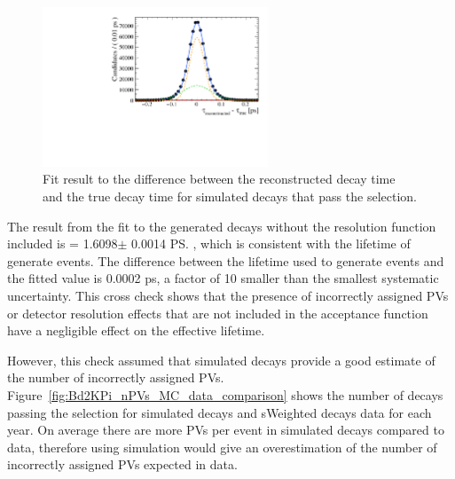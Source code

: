 \begin{figure}[htbp]
  \centering
    \includegraphics[width=0.6\textwidth]{./Figs/LifetimeSystematics/PV_decaytime_diff_fit.pdf}
  \caption{Fit result to the difference between the reconstructed decay time and the true decay time for simulated decays that pass the \bsmumu \el selection.}
  \label{fig:PVfit}
\end{figure}


The result from the fit to the generated decays without the resolution function included is \tmumu = 1.6098$\pm$ 0.0014 \ps, which is consistent with the lifetime of generate events. The difference between the lifetime used to generate events and the fitted value is 0.0002 ps, a factor of 10 smaller than the smallest systematic uncertainty. This cross check shows that the presence of incorrectly assigned PVs or detector resolution effects that are not included in the acceptance function have a negligible effect on the \bsmumu effective lifetime.



However, this check assumed that simulated decays provide a good estimate of the number of incorrectly assigned PVs. Figure~\ref{fig:Bd2KPi_nPVs_MC_data_comparison} shows the number of \bdkpi decays passing the selection for simulated \bdkpi decays and sWeighted decays data for each year. On average there are more PVs per event in simulated decays compared to data, therefore using simulation would give an overestimation of the number of incorrectly assigned PVs expected in data. 

